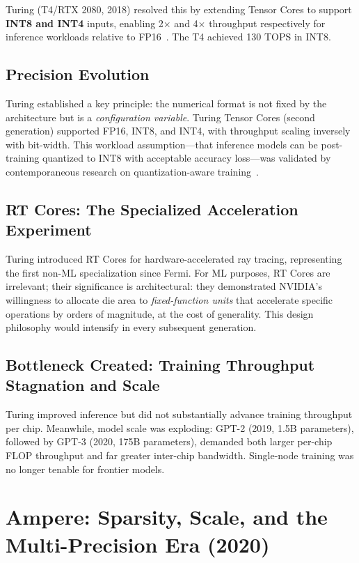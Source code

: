 \documentclass[10pt,twocolumn]{article}
\begin{document}
Turing (T4/RTX 2080, 2018) resolved this by extending Tensor Cores to support \textbf{INT8 and INT4} inputs, enabling 2$\times$ and 4$\times$ throughput respectively for inference workloads relative to FP16~\citep{nvidia2018turing}. The T4 achieved 130 TOPS in INT8.

\subsection{Precision Evolution}

Turing established a key principle: the numerical format is not fixed by the architecture but is a \textit{configuration variable}. Turing Tensor Cores (second generation) supported FP16, INT8, and INT4, with throughput scaling inversely with bit-width. This workload assumption—that inference models can be post-training quantized to INT8 with acceptable accuracy loss—was validated by contemporaneous research on quantization-aware training~\citep{jacob2018quantization}.

\subsection{RT Cores: The Specialized Acceleration Experiment}

Turing introduced RT Cores for hardware-accelerated ray tracing, representing the first non-ML specialization since Fermi. For ML purposes, RT Cores are irrelevant; their significance is architectural: they demonstrated NVIDIA's willingness to allocate die area to \textit{fixed-function units} that accelerate specific operations by orders of magnitude, at the cost of generality. This design philosophy would intensify in every subsequent generation.

\subsection{Bottleneck Created: Training Throughput Stagnation and Scale}

Turing improved inference but did not substantially advance training throughput per chip. Meanwhile, model scale was exploding: GPT-2 (2019, 1.5B parameters), followed by GPT-3 (2020, 175B parameters), demanded both larger per-chip FLOP throughput and far greater inter-chip bandwidth. Single-node training was no longer tenable for frontier models.

\section{Ampere: Sparsity, Scale, and the Multi-Precision Era (2020)}
\label{sec:ampere}
\end{document}
